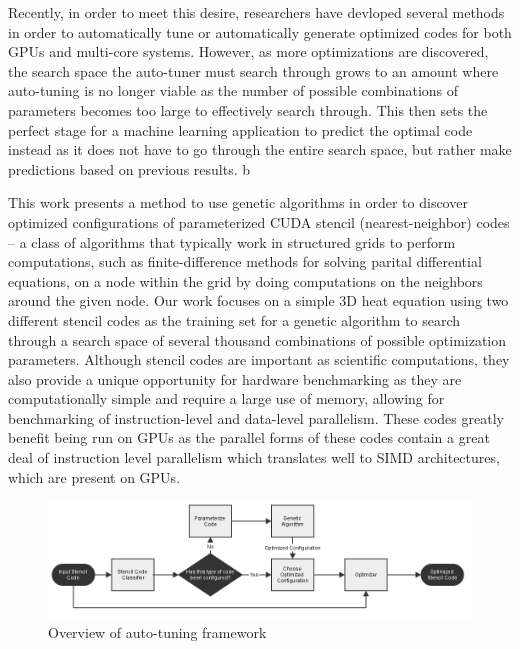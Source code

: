 \documentclass[conference]{IEEEtran}
\newcommand {\todo}[1] {\textcolor{red}{#1}}
\begin{document}
	Recently, in order to meet this desire, researchers have devloped several methods in order to automatically tune or automatically generate optimized codes for both GPUs and multi-core systems. However, as more optimizations are discovered, the search space the auto-tuner must search through grows to an amount where auto-tuning is no longer viable as the number of possible combinations of parameters becomes too large to effectively search through. This then sets the perfect stage for a machine learning application to predict the optimal code instead as it does not have to go through the entire search space, but rather make predictions based on previous results.
	b

	This work presents a method to use genetic algorithms in order to discover optimized configurations of parameterized CUDA stencil (nearest-neighbor) codes -- a class of algorithms that typically work in structured grids to perform computations, such as finite-difference methods for solving parital differential equations, on a node within the grid by doing computations on the neighbors around the given node. Our work focuses on a simple 3D heat equation using two different stencil codes as the training set for a genetic algorithm to search through a search space of several thousand combinations of possible optimization parameters. Although stencil codes are important as scientific computations, they also provide a unique opportunity for hardware benchmarking as they are computationally simple and require a large use of memory, allowing for benchmarking of instruction-level and data-level parallelism\cite{Datta}. These codes greatly benefit being run on GPUs as the parallel forms of these codes contain a great deal of instruction level parallelism which translates well to SIMD architectures, which are present on GPUs.

\begin{figure}[ht]
	\centering
	\includegraphics[width=\linewidth]{auto-tuning_framework.png}
	\caption{Overview of auto-tuning framework}
\end{figure}
\end{document}
